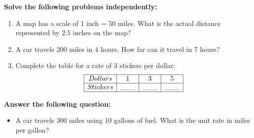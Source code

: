 \documentclass[12pt]{article}
\begin{document}
\begin{tcolorbox}[colframe=black!60, colback=white, 
coltitle=black, colbacktitle=black!15, fonttitle=\bfseries\Large, 
title=Independent Practice, halign title=center, left=10pt, right=10pt, top=10pt, bottom=45pt]
\textbf{Solve the following problems independently:}
\begin{enumerate}[itemsep=3em]
    \item A map has a scale of 1 inch = 50 miles. What is the actual distance represented by \( 2.5 \) inches on the map?
    \item A car travels 200 miles in 4 hours. How far can it travel in 7 hours?
    \item Complete the table for a rate of 3 stickers per dollar:
    \[
    \begin{array}{|c|c|c|c|}
    \hline
    Dollars & 1 & 3 & 5 \\
    \hline
    Stickers & \_\_\_ & \_\_\_ & \_\_\_ \\
    \hline
    \end{array}
    \]
\end{enumerate}
\end{tcolorbox}

\vspace{1em}

\begin{tcolorbox}[colframe=black!60, colback=white, 
coltitle=black, colbacktitle=black!15, fonttitle=\bfseries\Large, 
title=Exit Ticket, halign title=center, left=10pt, right=10pt, top=10pt, bottom=110pt]
\textbf{Answer the following question:}
\begin{itemize}
    \item A car travels 300 miles using 10 gallons of fuel. What is the unit rate in miles per gallon?
\end{itemize}
\end{tcolorbox}
\end{document}
